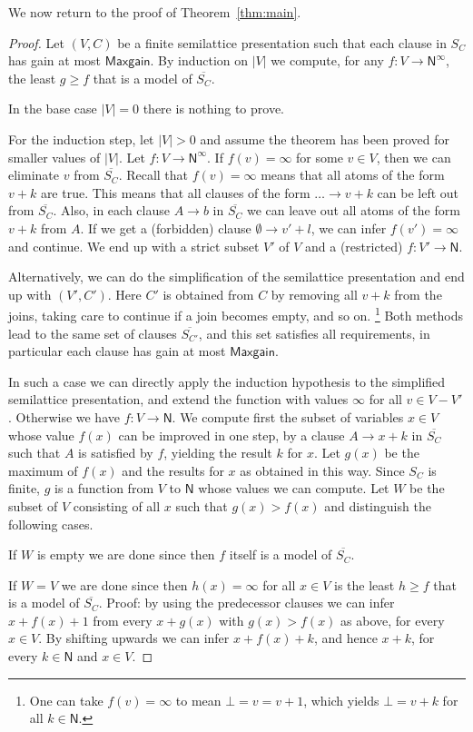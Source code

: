 \documentclass[11pt,a4paper]{article}
\newcommand{\N}{\mathsf{N}}
\newcommand\Ninf{\N^\infty}
\newcommand\M{\mathsf{Maxgain}}
\newcommand\upS[1]{\overline{S_{#1}}}
\begin{document}
We now return to the proof of Theorem~\ref{thm:main}.

\begin{proof}
Let  $(V,C)$ be a finite semilattice presentation
such that each clause in $S_C$ has gain at most $\M$.
By induction on $|V|$ we compute, for any $f: V\to\Ninf$,
the least $g \geqslant f$ that is a model of $\upS{C}$.

In the base case $|V|=0$ there is nothing to prove.

For the induction step, let $|V|>0$ and assume the
theorem has been proved for smaller values of $|V|$.
Let $f: V\to\Ninf$. If $f(v)=\infty$ for some $v\in V$,
then we can eliminate $v$ from $\upS{C}$. Recall that
$f(v)=\infty$ means that all atoms of the form $v+k$
are true. This means that all clauses of the form
$\ldots\to v+k$ can be left out from $\upS{C}$.
Also, in each clause $A\to b$ in $\upS{C}$
we can leave out all atoms of the form $v+k$ from $A$.
If we get a (forbidden) clause $\emptyset\to v'+l$,
we can infer $f(v')=\infty$ and continue.
We end up with a strict subset $V'$ of $V$ and a (restricted)
$f : V' \to \N$.

Alternatively, we can do the simplification of the semilattice
presentation and end up with $(V',C')$. Here $C'$
is obtained from $C$ by removing all $v+k$ from the joins,
taking care to continue if a join becomes empty, and so on.%
\footnote{One can take $f(v)=\infty$ to mean $\bot=v=v+1$,
which yields $\bot=v+k$ for all $k\in\N$.}
Both methods lead to the same set of clauses $\upS{C'}$,
and this set satisfies all requirements, in particular
each clause has gain at most $\M$.

In such a case we can directly apply the induction hypothesis
to the simplified semilattice presentation, and extend the
function with values $\infty$ for all $v \in V-V'$.
Otherwise we have $f: V\to\N$.
We compute first the subset of variables $x\in V$ 
whose value $f(x)$ can be improved in one step,
by a clause $A\to x+k$ in $\upS{C}$ such that $A$ is
satisfied by $f$, yielding the result $k$ for $x$. 
Let $g(x)$ be the maximum of $f(x)$ and the results
for $x$ as obtained in this way. Since $S_C$ is finite,
$g$ is a function from $V$ to $\N$ whose values we can
compute. Let $W$ be the subset of $V$ consisting of
all $x$ such that $g(x) > f(x)$ and distinguish the
following cases.

If $W$ is empty we are done since then $f$ itself 
is a model of $\upS{C}$.

If $W = V$ we are done since then $h(x) = \infty$ for all 
$x \in V$ is the least $h \geqslant f$ that is a model of $\upS{C}$.
Proof: by using the predecessor clauses we can infer
$x+f(x)+1$ from every $x+g(x)$ with $g(x)>f(x)$ as above,
for every $x\in V$. By shifting upwards we can infer
$x+f(x)+k$, and hence $x+k$, for every $k\in\N$ and $x\in V$.


\end{proof}
\end{document}
